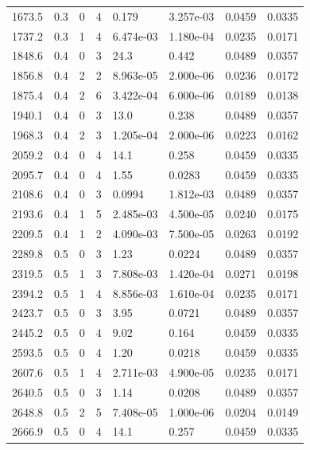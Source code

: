\documentclass[preview]{standalone}
\begin{document}
{{{\begin{tabular}{L{1.2cm}C{1.2cm} C{0.3cm}C{0.5cm} C{1.4cm}C{1.4cm} C{1.4cm}C{1.4cm}}
  1673.5  &   0.3  & 0     &  4 &  0.179  & 3.257e-03  & 0.0459 &  0.0335   \\ 
  1737.2  &   0.3  & 1     &  4 &  6.474e-03  & 1.180e-04  & 0.0235 &  0.0171   \\ 
  1848.6  &   0.4  & 0     &  3 &  24.3  & 0.442  & 0.0489 &  0.0357   \\ 
  1856.8  &   0.4  & 2     &  2 &  8.963e-05  & 2.000e-06  & 0.0236 &  0.0172   \\ 
  1875.4  &   0.4  & 2     &  6 &  3.422e-04  & 6.000e-06  & 0.0189 &  0.0138   \\ 
  1940.1  &   0.4  & 0     &  3 &  13.0  & 0.238  & 0.0489 &  0.0357   \\ 
  1968.3  &   0.4  & 2     &  3 &  1.205e-04  & 2.000e-06  & 0.0223 &  0.0162   \\ 
  2059.2  &   0.4  & 0     &  4 &  14.1  & 0.258  & 0.0459 &  0.0335   \\ 
  2095.7  &   0.4  & 0     &  4 &  1.55  & 0.0283  & 0.0459 &  0.0335   \\ 
  2108.6  &   0.4  & 0     &  3 &  0.0994  & 1.812e-03  & 0.0489 &  0.0357   \\ 
  2193.6  &   0.4  & 1     &  5 &  2.485e-03  & 4.500e-05  & 0.0240 &  0.0175   \\ 
  2209.5  &   0.4  & 1     &  2 &  4.090e-03  & 7.500e-05  & 0.0263 &  0.0192   \\ 
  2289.8  &   0.5  & 0     &  3 &  1.23  & 0.0224  & 0.0489 &  0.0357   \\ 
  2319.5  &   0.5  & 1     &  3 &  7.808e-03  & 1.420e-04  & 0.0271 &  0.0198   \\ 
  2394.2  &   0.5  & 1     &  4 &  8.856e-03  & 1.610e-04  & 0.0235 &  0.0171   \\ 
  2423.7  &   0.5  & 0     &  3 &  3.95  & 0.0721  & 0.0489 &  0.0357   \\ 
  2445.2  &   0.5  & 0     &  4 &  9.02  & 0.164  & 0.0459 &  0.0335   \\ 
  2593.5  &   0.5  & 0     &  4 &  1.20  & 0.0218  & 0.0459 &  0.0335   \\ 
  2607.6  &   0.5  & 1     &  4 &  2.711e-03  & 4.900e-05  & 0.0235 &  0.0171   \\ 
  2640.5  &   0.5  & 0     &  3 &  1.14  & 0.0208  & 0.0489 &  0.0357   \\ 
  2648.8  &   0.5  & 2     &  5 &  7.408e-05  & 1.000e-06  & 0.0204 &  0.0149   \\ 
  2666.9  &   0.5  & 0     &  4 &  14.1  & 0.257  & 0.0459 &  0.0335   \\ 

\end{tabular}}}}
\end{document}
